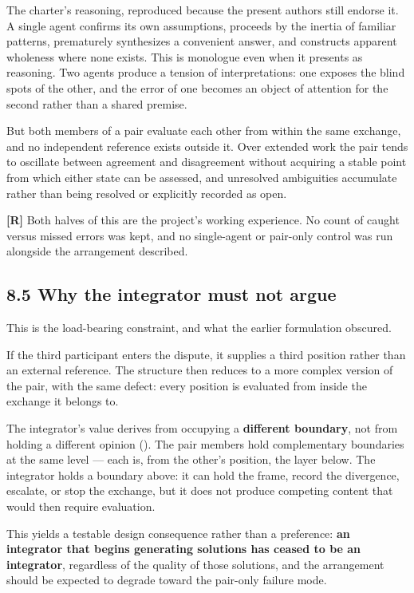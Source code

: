 The charter's reasoning, reproduced because the present authors still endorse it. A single agent confirms its own assumptions, proceeds by the inertia of familiar patterns, prematurely synthesizes a convenient answer, and constructs apparent wholeness where none exists. This is monologue even when it presents as reasoning. Two agents produce a tension of interpretations: one exposes the blind spots of the other, and the error of one becomes an object of attention for the second rather than a shared premise.

But both members of a pair evaluate each other from within the same exchange, and no independent reference exists outside it. Over extended work the pair tends to oscillate between agreement and disagreement without acquiring a stable point from which either state can be assessed, and unresolved ambiguities accumulate rather than being resolved or explicitly recorded as open.

\textbf{[R]} Both halves of this are the project's working experience. No count of caught versus missed errors was kept, and no single-agent or pair-only control was run alongside the arrangement described.


\subsection*{8.5 Why the integrator must not argue}
\label{sec:en:8.5}

This is the load-bearing constraint, and what the earlier formulation obscured.

If the third participant enters the dispute, it supplies a third position rather than an external reference. The structure then reduces to a more complex version of the pair, with the same defect: every position is evaluated from inside the exchange it belongs to.

The integrator's value derives from occupying a \textbf{different boundary}, not from holding a different opinion (). The pair members hold complementary boundaries at the same level — each is, from the other's position, the layer below. The integrator holds a boundary above: it can hold the frame, record the divergence, escalate, or stop the exchange, but it does not produce competing content that would then require evaluation.

This yields a testable design consequence rather than a preference: \textbf{an integrator that begins generating solutions has ceased to be an integrator}, regardless of the quality of those solutions, and the arrangement should be expected to degrade toward the pair-only failure mode.



